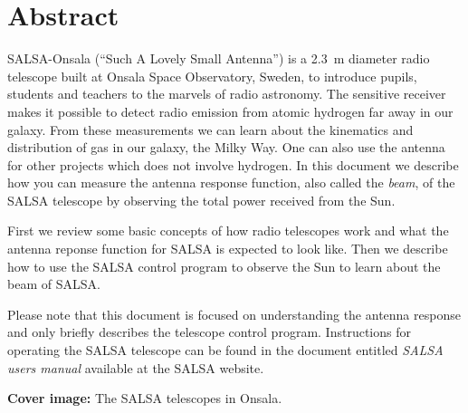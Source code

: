 \chapter*{Abstract}
SALSA-Onsala (``Such A Lovely Small Antenna'') is a 2.3~m diameter radio
telescope built at Onsala Space Observatory, Sweden, to introduce pupils,
students and teachers to the marvels of radio astronomy.  The sensitive
receiver makes it possible to detect radio emission from atomic hydrogen far
away in our galaxy. From these measurements we can learn about the kinematics
and distribution of gas in our galaxy, the Milky Way. One can also use
the antenna for other projects which does not involve hydrogen. In this
document we describe how you can measure the antenna response function,
also called the \emph{beam}, of the SALSA telescope by observing the 
total power received from the Sun.

First we review some basic concepts of how radio telescopes work and
what the antenna reponse function for SALSA is expected to look like. 
Then we describe how to use the SALSA control program to observe the
Sun to learn about the beam of SALSA. 

Please note that this document is focused on understanding the antenna
response and only briefly describes the telescope control program. 
Instructions for operating the SALSA telescope can be found in the document
entitled \emph{SALSA users manual} available at the SALSA website.


\vspace{9cm}




{\bf Cover image:} The SALSA telescopes in Onsala.
